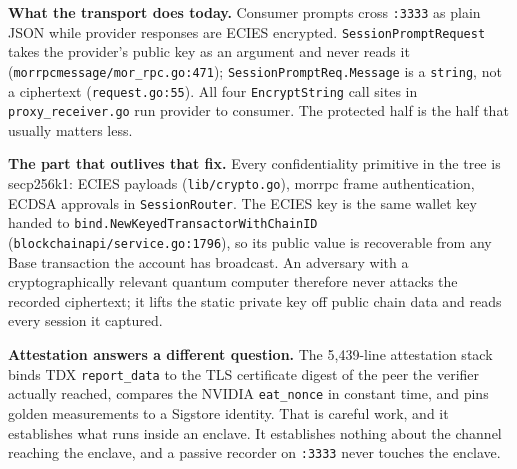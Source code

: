 \documentclass[10pt,a4paper]{article}
\newcommand{\code}[1]{\texttt{\small #1}}
\begin{document}

\noindent\textbf{What the transport does today.}
Consumer prompts cross \code{:3333} as plain JSON while provider responses are
ECIES encrypted. \code{SessionPromptRequest} takes the provider's public key as
an argument and never reads it (\code{morrpcmessage/mor\_rpc.go:471});
\code{SessionPromptReq.Message} is a \code{string}, not a ciphertext
(\code{request.go:55}). All four \code{EncryptString} call sites in
\code{proxy\_receiver.go} run provider to consumer. The protected half is the
half that usually matters less.

\vspace{0.35ex}
\noindent\textbf{The part that outlives that fix.}
Every confidentiality primitive in the tree is secp256k1: ECIES payloads
(\code{lib/crypto.go}), morrpc frame authentication, ECDSA approvals in
\code{SessionRouter}. The ECIES key is the same wallet key handed to
\code{bind.NewKeyedTransactorWithChainID}
(\code{blockchainapi/service.go:1796}), so its public value is recoverable from
any Base transaction the account has broadcast. An adversary with a
cryptographically relevant quantum computer therefore never attacks the
recorded ciphertext; it lifts the static private key off public chain data and
reads every session it captured.

\vspace{0.35ex}
\noindent\textbf{Attestation answers a different question.}
The 5{,}439-line attestation stack binds TDX \code{report\_data} to the TLS
certificate digest of the peer the verifier actually reached, compares the NVIDIA
\code{eat\_nonce} in constant time, and pins golden measurements to a Sigstore
identity. That is careful work, and it establishes what runs inside an enclave. It establishes nothing about the channel reaching
the enclave, and a passive recorder on \code{:3333} never touches the enclave.
\end{document}
